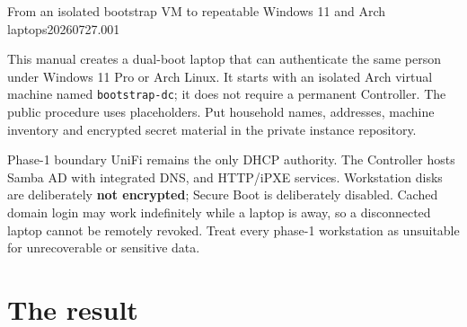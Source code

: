 


  {From an isolated bootstrap VM to repeatable Windows 11 and Arch laptops}{20260727.001}

\newcommand{\wfcaption}[1]{\par\smallskip{\centering\footnotesize\itshape #1\par}}



This manual creates a dual-boot laptop that can authenticate the same person
under Windows 11 Pro or Arch Linux. It starts with an isolated Arch virtual
machine named \texttt{bootstrap-dc}; it does not require a permanent Controller.
The public procedure uses placeholders. Put household names, addresses,
machine inventory and encrypted secret material in the private instance
repository.

\begin{gate}{Phase-1 boundary}
UniFi remains the only DHCP authority. The Controller hosts Samba AD with
integrated DNS, and HTTP/iPXE services. Workstation disks are deliberately
\textbf{not encrypted}; Secure Boot is deliberately disabled. Cached domain
login may work indefinitely while a laptop is away, so a disconnected laptop
cannot be remotely revoked. Treat every phase-1 workstation as unsuitable for
unrecoverable or sensitive data.
\end{gate}

\section{The result}

